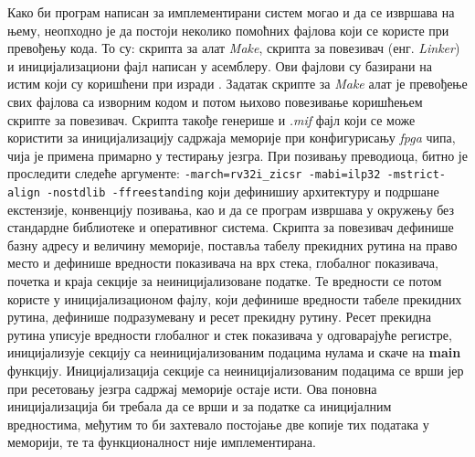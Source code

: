 Како би програм написан за имплементирани систем могао и да се извршава на њему, неопходно је да постоји неколико помоћних фајлова који се користе при превођењу кода. То су: скрипта за алат \textit{Make}, скрипта за повезивач (енг. \textit{Linker}) и иницијализациони фајл написан у асемблеру. Ови фајлови су базирани на истим који су коришћени при изради \cite{arilla}. Задатак скрипте за \textit{Make} алат је превођење свих фајлова са изворним кодом и потом њихово повезивање коришћењем скрипте за повезивач. Скрипта такође генерише и \textit{.mif} фајл који се може користити за иницијализацију садржаја меморије при конфигурисању \textit{\acrshort{fpga}} чипа, чија је примена примарно у тестирању језгра. При позивању преводиоца, битно је проследити следеће аргументе: \lstinline[language=none,columns=fixed]{-march=rv32i_zicsr -mabi=ilp32 -mstrict-align -nostdlib -ffreestanding} који дефинишиу архитектуру и подршане екстензије, конвенцију позивања, као и да се програм извршава у окружењу без стандардне библиотеке и оперативног система. 
 Скрипта за повезивач дефинише базну адресу и величину меморије, поставља табелу прекидних рутина на право место и дефинише вредности показивача на врх стека, глобалног показивача, почетка и краја секције за неиницијализоване податке. Те вредности се потом користе у иницијализационом фајлу, који дефинише вредности табеле прекидних рутина, дефинише подразумевану и ресет прекидну рутину.
Ресет прекидна рутина уписује вредности глобалног и стек показивача у одговарајуће регистре, иницијализује секцију са неиницијализованим подацима нулама и скаче на \textbf{main} функцију.
Иницијализација секције са неиницијализованим подацима се врши јер при ресетовању језгра садржај меморије остаје исти. Ова поновна иницијализација би требала да се врши и за податке са иницијалним вредностима, међутим то би захтевало постојање две копије тих података у меморији, те та функционалност није имплементирана.  \newpage
